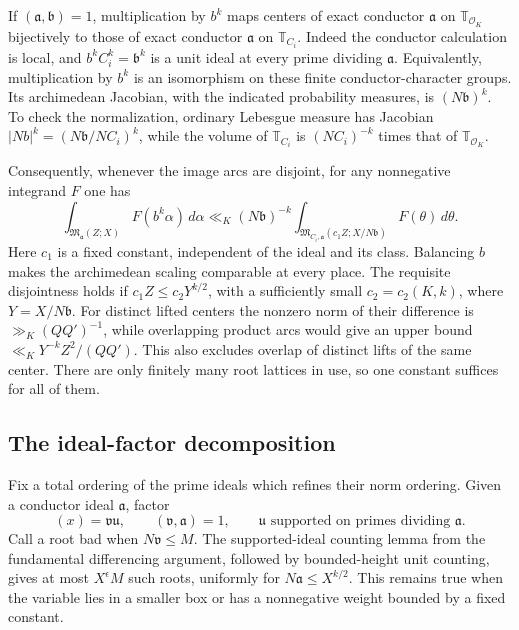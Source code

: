 \documentclass[11pt]{amsart}
\theoremstyle{definition}
\numberwithin{equation}{section}
\begin{document}
If $(\mathfrak a,\mathfrak b)=1$, multiplication by $b^k$ maps centers
of exact conductor $\mathfrak a$ on $\mathbb T_{\mathcal O_K}$ bijectively
to those of exact conductor $\mathfrak a$ on $\mathbb T_{C_i}$.
Indeed the conductor calculation is local, and
$b^kC_i^k=\mathfrak b^k$ is a unit ideal at every prime dividing
$\mathfrak a$.  Equivalently, multiplication by $b^k$ is an isomorphism
on these finite conductor-character groups.
Its archimedean Jacobian, with the indicated probability measures, is
$(N\mathfrak b)^k$.  To check the normalization, ordinary Lebesgue measure
has Jacobian $|Nb|^k=(N\mathfrak b/NC_i)^k$, while the volume of
$\mathbb T_{C_i}$ is $(NC_i)^{-k}$ times that of $\mathbb T_{\mathcal O_K}$.

Consequently, whenever the image arcs are disjoint, for any nonnegative
integrand $F$ one has
\begin{equation}\label{eq:field-arc-scaling}
 \int_{\mathfrak M_{\mathfrak a}(Z;X)}F(b^k\alpha)\,d\alpha
 \ll_K (N\mathfrak b)^{-k}
 \int_{\mathfrak M_{C_i,\mathfrak a}(c_1Z;X/N\mathfrak b)}
                         F(\theta)\,d\theta .
\end{equation}
Here $c_1$ is a fixed constant, independent of the ideal and its class.
Balancing $b$ makes the archimedean scaling comparable at every place.
The requisite disjointness holds if
$c_1Z\le c_2Y^{k/2}$, with a sufficiently small $c_2=c_2(K,k)$,
where $Y=X/N\mathfrak b$.
For distinct lifted centers the nonzero norm of their difference is
$\gg_K(QQ')^{-1}$, while overlapping product arcs would give an upper
bound $\ll_KY^{-k}Z^2/(QQ')$.  This also excludes overlap of distinct
lifts of the same center.  There are only finitely many root lattices
in use, so one constant suffices for all of them.

\subsection{The ideal-factor decomposition}

Fix a total ordering of the prime ideals which refines their norm ordering.
Given a conductor ideal $\mathfrak a$, factor
\[
 (x)=\mathfrak v\mathfrak u,
 \qquad (\mathfrak v,\mathfrak a)=1,
 \qquad \mathfrak u\text{ supported on primes dividing }\mathfrak a.
\]
Call a root bad when $N\mathfrak v\le M$.  The supported-ideal counting
lemma from the fundamental differencing argument, followed by bounded-height
unit counting, gives at most $X^\epsilon M$ such roots, uniformly for
$N\mathfrak a\le X^{k/2}$.  This remains true when the variable lies in
a smaller box or has a nonnegative weight bounded by a fixed constant.
\end{document}
